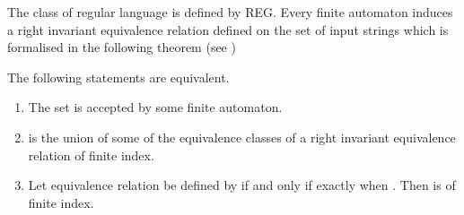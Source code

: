 \documentclass{llncs}
\begin{document}
The class of regular language is defined by REG. Every finite automaton
induces a right invariant equivalence relation defined on the set of input
 strings which is formalised in the following theorem (see \cite{HMU})

\begin{theorem}
The following statements are equivalent.
\begin{enumerate}
\item The set  is accepted by some finite automaton.
\item  is the union of some of the equivalence classes of a right
invariant equivalence relation of finite index.
\item Let equivalence relation  be defined by  if and only if
  exactly when . Then  is of finite index.
\end{enumerate}
\end{theorem}
\end{document}

